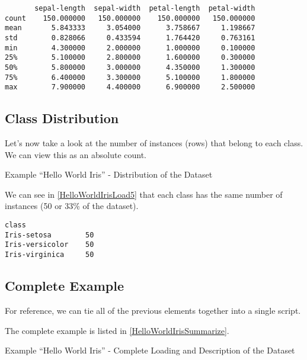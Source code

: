 \begin{lstlisting}
       sepal-length  sepal-width  petal-length  petal-width
count    150.000000   150.000000    150.000000   150.000000
mean       5.843333     3.054000      3.758667     1.198667
std        0.828066     0.433594      1.764420     0.763161
min        4.300000     2.000000      1.000000     0.100000
25%        5.100000     2.800000      1.600000     0.300000
50%        5.800000     3.000000      4.350000     1.300000
75%        6.400000     3.300000      5.100000     1.800000
max        7.900000     4.400000      6.900000     2.500000
\end{lstlisting}
    
\subsection{Class Distribution}

Let's now take a look at the number of instances (rows) that belong to each class. We can view this as an absolute count.
    
\begin{code}
      
    
  \caption{Example ``Hello World Iris'' - Distribution of the Dataset} \label{HelloWorldIrisLoad5}
\end{code}      

We can see in \ref{HelloWorldIrisLoad5} that each class has the same number of instances (50 or 33\% of the dataset).

\begin{lstlisting}
class
Iris-setosa        50
Iris-versicolor    50
Iris-virginica     50
\end{lstlisting}    


\subsection{Complete Example}

For reference, we can tie all of the previous elements together into a single script.
    
The complete example is listed in  \ref{HelloWorldIrisSummarize}.

\begin{code}
      
    
  \caption{Example ``Hello World Iris'' - Complete Loading and Description of the Dataset} \label{HelloWorldIrisSummarize}
\end{code}      

